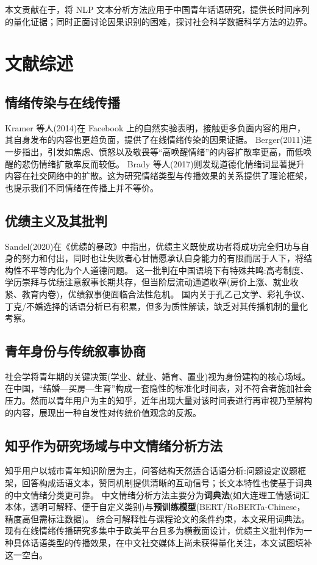 \documentclass[11pt,a4paper]{ctexart}
\begin{document}
本文贡献在于，将 NLP 文本分析方法应用于中国青年话语研究，提供长时间序列的量化证据；同时正面讨论因果识别的困难，探讨社会科学数据科学方法的边界。

\section{文献综述}

\subsection{情绪传染与在线传播}
Kramer 等人(2014)在 Facebook 上的自然实验表明，接触更多负面内容的用户，其自身发布的内容也更趋负面，提供了在线情绪传染的因果证据。
Berger(2011)进一步指出，引发如焦虑、愤怒以及敬畏等“高唤醒情绪”的内容扩散率更高，而低唤醒的悲伤情绪扩散率反而较低。
Brady 等人(2017)则发现道德化情绪词显著提升内容在社交网络中的扩散。这为研究情绪类型与传播效果的关系提供了理论框架，也提示我们不同情绪在传播上并不等价。

\subsection{优绩主义及其批判}
Sandel(2020)在《优绩的暴政》中指出，优绩主义既使成功者将成功完全归功与自身的努力和付出，同时也让失败者心甘情愿承认自身能力的有限而居于人下，将结构性不平等内化为个人道德问题。
这一批判在中国语境下有特殊共鸣:高考制度、学历崇拜与优绩注意叙事长期共存，但当阶层流动通道收窄(房价上涨、就业收紧、教育内卷)，优绩叙事便面临合法性危机。
国内关于孔乙己文学、彩礼争议、丁克/不婚选择的话语分析已有积累，但多为质性解读，缺乏对其传播机制的量化考察。

\subsection{青年身份与传统叙事协商}
社会学将青年期的关键决策(学业、就业、婚育、置业)视为身份建构的核心场域。
在中国，“结婚—买房—生育”构成一套隐性的标准化时间表，对不符合者施加社会压力。然而以青年用户为主的知乎，近年出现大量对该时间表进行再审视乃至解构的内容，展现出一种自发性对传统价值观念的反叛。

\subsection{知乎作为研究场域与中文情绪分析方法}
知乎用户以城市青年知识阶层为主，问答结构天然适合话语分析:问题设定议题框架，回答构成话语文本，赞同机制提供清晰的互动信号；长文本特性也使基于词典的中文情绪分类更可靠。
中文情绪分析方法主要分为\textbf{词典法}(如大连理工情感词汇本体，透明可解释、便于自定义类别)与\textbf{预训练模型}(BERT/RoBERTa-Chinese，精度高但需标注数据)。
综合可解释性与课程论文的条件约束，本文采用词典法。现有在线情绪传播研究多集中于欧美平台且多为横截面设计，优绩主义批判作为一种具体话语类型的传播效果，在中文社交媒体上尚未获得量化关注，本文试图填补这一空白。
\end{document}
